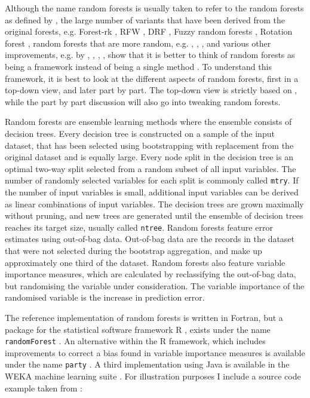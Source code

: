 \documentclass[a4paper,man,12pt,apacite,floatsintext,draftfirst]{apa6} %
\begin{document}
Although the name random forests is usually taken to refer to the random
forests as defined by , the large number of
variants that have been derived from the original forests, e.g.
Forest-rk \cite{bernard2008forest}, RFW \cite{maudes2012random},
DRF \cite{bernard2012dynamic}, Fuzzy random forests \cite{bonissone2008fuzzy},
Rotation forest \cite{rodriguez2006rotation}, random forests that are
more random, e.g. , ,
, and various other improvements, e.g. by
, ,
, , show that it
is better to think of random forests as being a framework instead of being
a single method \cite{wpRF}.
To understand this framework, it is best to look at the different aspects
of random forests, first in a top-down view, and later part by part.
The top-down view is strictly based on ,
while the part by part discussion will also go into tweaking random forests.

Random forests are ensemble learning methods where the ensemble consists
of decision trees.
Every decision tree is constructed on a sample of the input dataset,
that has been selected using bootstrapping with replacement from the original
dataset and is equally large.
Every node split in the decision tree is an optimal two-way split selected
from a random subset of all input variables.
The number of randomly selected variables for each split is commonly called
\texttt{mtry}.
If the number of input variables is small, additional input variables can be
derived as linear combinations of input variables.
The decision trees are grown maximally without pruning,
and new trees are generated until the ensemble of decision trees reaches its
target size, usually called \texttt{ntree}.
Random forests feature error estimates using out-of-bag data.
Out-of-bag data are the records in the dataset that were not selected during
the bootstrap aggregation, and make up approximately one third of the dataset.
Random forests also feature variable importance measures,
which are calculated by reclassifying the out-of-bag data,
but randomising the variable under consideration.
The variable importance of the randomised variable is the increase in
prediction error.

The reference implementation of random forests is written in Fortran,
but a package for the statistical software framework R \cite{rproject2012},
exists under the name \texttt{randomForest} \cite{liaw2002classification}.
An alternative within the R framework, which includes improvements
to correct a bias found in variable
importance measures is available under the name \texttt{party}
\cite{strobl2008conditional}.
A third implementation using Java is available in the WEKA machine learning
suite \cite{hall2009weka}.
For illustration purposes I include a source code example taken from
:
\end{document}
